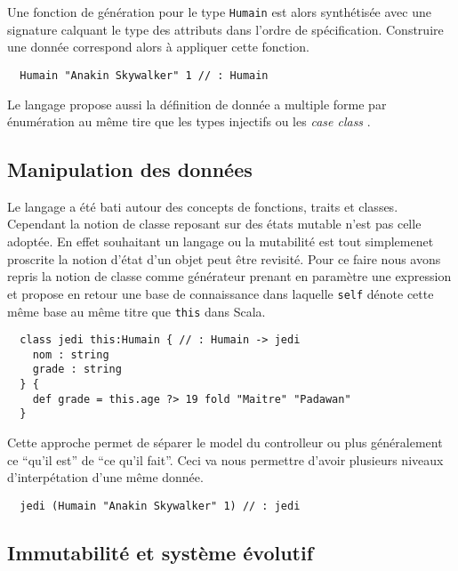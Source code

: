 \documentclass[twoside,a4paper]{article}
\begin{document}
Une  fonction  de génération  pour  le  type  {\tt Humain}  est  alors
synthétisée avec  une signature  calquant le  type des  attributs dans
l'ordre de  spécification.  Construire  une donnée correspond  alors à
appliquer cette fonction.

\lstset{language=Thicket}
\begin{lstlisting}
  Humain "Anakin Skywalker" 1 // : Humain
\end{lstlisting}

Le langage propose aussi la définition  de donnée a multiple forme par
énumération  au  même  tire   que  les  types  injectifs  \cite{Ocaml}
\cite{Haskell} ou les {\it case class} \cite{Scala}.

\subsection{Manipulation des données}

Le  langage  a été  bati  autour  des  concepts de  fonctions,  traits
\cite{traits} et classes.  Cependant la notion de  classe reposant sur
des états  mutable n'est  pas celle adoptée.   En effet  souhaitant un
langage  ou la  mutabilité est  tout simplemenet  proscrite la  notion
d'état d'un objet peut être revisité.  Pour ce faire nous avons repris
la  notion  de  classe  comme  générateur  prenant  en  paramètre  une
expression et propose en retour une base de connaissance dans laquelle
{\tt self}  dénote cette même base  au même titre que  {\tt this} dans
Scala.

\lstset{language=Thicket}
\begin{lstlisting}
  class jedi this:Humain { // : Humain -> jedi
    nom : string
    grade : string
  } {
    def grade = this.age ?> 19 fold "Maitre" "Padawan"
  }
\end{lstlisting}


Cette  approche permet  de séparer le  model du  controlleur ou  plus
généralement  ce ``qu'il  est'' de  ``ce  qu'il fait''.  Ceci va  nous
permettre d'avoir plusieurs niveaux d'interpétation d'une même donnée.

\lstset{language=Thicket}
\begin{lstlisting}
  jedi (Humain "Anakin Skywalker" 1) // : jedi
\end{lstlisting}

\subsection{Immutabilité et système évolutif}
\end{document}
